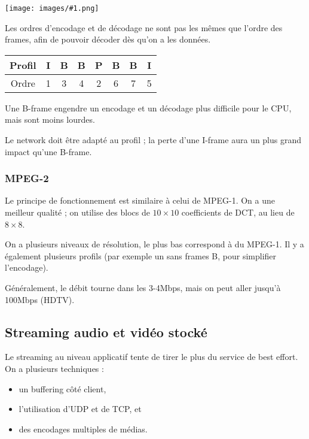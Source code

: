 \documentclass[10pt,a4paper]{report}
\newcommand{\dessinS}[2]{\begin{center}\texttt{[image: images/\#1.png]}\end{center}}
\begin{document}
			\dessinS{131}{.65}
		
			Les ordres d'encodage et de décodage ne sont pas les mêmes que l'ordre des frames, afin de pouvoir décoder dès qu'on a les données.
		
\begin{center}
\begin{tabular}{|c|c|c|c|c|c|c|c|}
\hline 
Profil & I & B & B & P & B & B & I \\ 
\hline 
Ordre & 1 & 3 & 4 & 2 & 6 & 7 & 5 \\ 
\hline 
\end{tabular}
\end{center} 
		
			Une B-frame engendre un encodage et un décodage plus difficile pour le CPU, mais sont moins lourdes.
		
			Le network doit être adapté au profil ; la perte d'une I-frame aura un plus grand impact qu'une B-frame.
		
			\subsubsection{MPEG-2}
			
			Le principe de fonctionnement est similaire à celui de MPEG-1. On a une meilleur qualité ; on utilise des blocs de $10 \times 10$ coefficients de DCT, au lieu de $8 \times 8$.
			
			On a plusieurs niveaux de résolution, le plus bas correspond à du MPEG-1. Il y a également plusieurs profils (par exemple un sans frames B, pour simplifier l'encodage).
			
			Généralement, le débit tourne dans les 3-4Mbps, mais on peut aller jusqu'à 100Mbps (HDTV).
		
				
		\subsection{Streaming audio et vidéo stocké}
		
		Le streaming au niveau applicatif tente de tirer le plus du service de best effort. On a plusieurs techniques :
		
		\begin{itemize}
			\item un buffering côté client,
			\item l'utilisation d'UDP et de TCP, et
			\item des encodages multiples de médias.
		\end{itemize}
		
\end{document}
